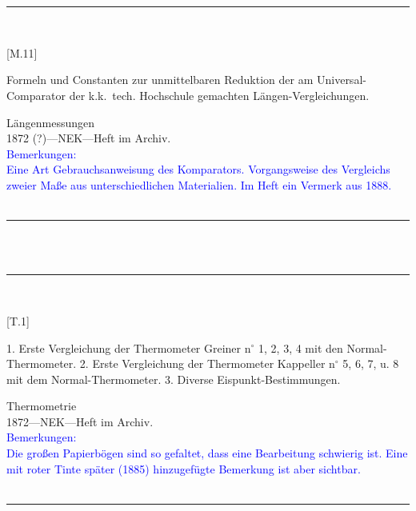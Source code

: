 \\
\vspace*{-2.5pt}\\
\parbox{\textwidth}{%
\rule{\textwidth}{1pt}\vspace*{-3mm}\\
\begin{minipage}[t]{0.22\textwidth}\vspace{0pt}
\Huge\rule[-4mm]{0cm}{1cm}[M.11]
\end{minipage}
\hfill
\begin{minipage}[t]{0.78\textwidth}\vspace{0pt}
\large Formeln und Constanten zur unmittelbaren Reduktion der am Universal-Comparator der k.k.\ tech. Hochschule gemachten Längen-Vergleichungen.\rule[-2mm]{0mm}{2mm}
\end{minipage}
{\footnotesize\flushright
Längenmessungen\\
}
1872 (?)\quad---\quad NEK\quad---\quad Heft im Archiv.\\
\textcolor{blue}{Bemerkungen:\\{}
Eine Art Gebrauchsanweisung des Komparators. Vorgangsweise des Vergleichs zweier Maße aus unterschiedlichen Materialien. Im Heft ein Vermerk aus 1888.\\{}
}
\\[-15pt]
\rule{\textwidth}{1pt}
}
\\
\vspace*{-2.5pt}\\
\parbox{\textwidth}{%
\rule{\textwidth}{1pt}\vspace*{-3mm}\\
\begin{minipage}[t]{0.2\textwidth}\vspace{0pt}
\Huge\rule[-4mm]{0cm}{1cm}[T.1]
\end{minipage}
\hfill
\begin{minipage}[t]{0.8\textwidth}\vspace{0pt}
\large 1. Erste Vergleichung der Thermometer Greiner n{$^\circ$} 1, 2, 3, 4 mit den Normal-Thermometer. 2. Erste Vergleichung der Thermometer Kappeller n{$^\circ$} 5, 6, 7, u. 8 mit dem Normal-Thermometer. 3. Diverse Eispunkt-Bestimmungen.\rule[-2mm]{0mm}{2mm}
\end{minipage}
{\footnotesize\flushright
Thermometrie\\
}
1872\quad---\quad NEK\quad---\quad Heft im Archiv.\\
\textcolor{blue}{Bemerkungen:\\{}
Die großen Papierbögen sind so gefaltet, dass eine Bearbeitung schwierig ist. Eine mit roter Tinte später (1885) hinzugefügte Bemerkung ist aber sichtbar.\\{}
}
\\[-15pt]
\rule{\textwidth}{1pt}
}
